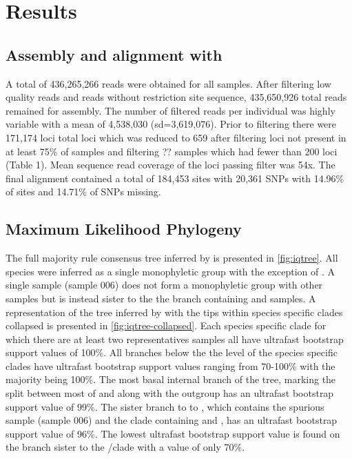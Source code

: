 


\section{Results}

\subsection{Assembly and alignment with \pyrad}
A total of 436,265,266 reads were obtained for all samples. After filtering low
quality reads and reads without restriction site sequence, 435,650,926 total reads 
remained for assembly.
The number of filtered reads per individual was highly variable with a mean of 
4,538,030 (sd=3,619,076).
Prior to filtering there were 171,174 loci total loci which was reduced to  
659 after filtering loci not present in at least 75\% of samples and filtering
?? samples which had fewer than 200 loci (Table 1).
Mean sequence read coverage of the loci passing filter was 54x.
The final alignment contained a total of 184,453 sites with 20,361 SNPs with 
14.96\% of sites and 14.71\% of SNPs missing.

\subsection{Maximum Likelihood Phylogeny}
The full majority rule consensus tree inferred by \iqtree is presented in \cref{fig:iqtree}. 
All species were inferred as a single monophyletic group with the exception 
of \fowl. 
A single \fowl sample (sample 006) does not form a monophyletic group with other 
\fowl samples but is instead sister to the the branch containing \wood and \fowl samples.
A representation of the tree inferred by \iqtree with the tips within
species specific clades collapsed is presented in \cref{fig:iqtree-collapsed}. 
Each species specific clade for which there are at least two representatives
samples all have ultrafast bootstrap support values of 100\%.
All branches below the the level of the species specific clades have ultrafast 
bootstrap support values ranging from 70-100\% with the majority being 100\%.
The most basal internal branch of the tree, marking the split between most of \anaxyrus
and \punctatus along with the outgroup \nebulifer has an ultrafast bootstrap 
support value of 99\%.
The sister branch to to \terr, which contains the spurious \fowl sample (sample 006)
and the clade containing \fowl and \wood, has an ultrafast bootstrap support 
value of 96\%.
The lowest ultrafast bootstrap support value is found on the branch sister 
to the \cognatus/\speciosus clade with a value of only 70\%.

